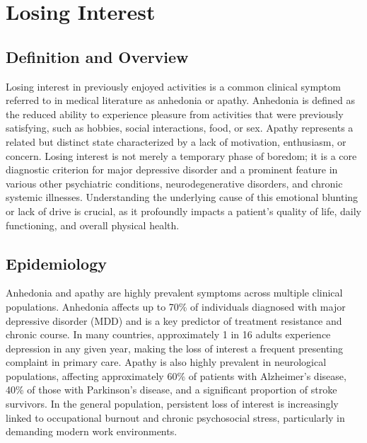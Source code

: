 \chapter{Losing Interest}

\section*{Definition and Overview}
Losing interest in previously enjoyed activities is a common clinical symptom referred to in medical literature as anhedonia or apathy. Anhedonia is defined as the reduced ability to experience pleasure from activities that were previously satisfying, such as hobbies, social interactions, food, or sex. Apathy represents a related but distinct state characterized by a lack of motivation, enthusiasm, or concern. Losing interest is not merely a temporary phase of boredom; it is a core diagnostic criterion for major depressive disorder and a prominent feature in various other psychiatric conditions, neurodegenerative disorders, and chronic systemic illnesses. Understanding the underlying cause of this emotional blunting or lack of drive is crucial, as it profoundly impacts a patient's quality of life, daily functioning, and overall physical health.

\section*{Epidemiology}
Anhedonia and apathy are highly prevalent symptoms across multiple clinical populations. Anhedonia affects up to 70\% of individuals diagnosed with major depressive disorder (MDD) and is a key predictor of treatment resistance and chronic course. In many countries, approximately 1 in 16 adults experience depression in any given year, making the loss of interest a frequent presenting complaint in primary care. Apathy is also highly prevalent in neurological populations, affecting approximately 60\% of patients with Alzheimer's disease, 40\% of those with Parkinson's disease, and a significant proportion of stroke survivors. In the general population, persistent loss of interest is increasingly linked to occupational burnout and chronic psychosocial stress, particularly in demanding modern work environments.

